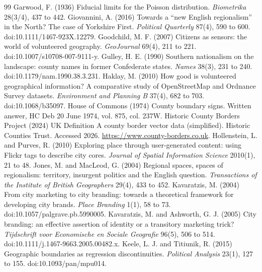 \documentclass[11pt,a4paper]{article}
\begin{document}
\begin{thebibliography}{99}
 Garwood, F. (1936) Fiducial limits for the Poisson distribution. \textit{Biometrika} 28(3/4), 437 to 442.
 Giovannini, A. (2016) Towards a ``new English regionalism'' in the North? The case of Yorkshire First. \textit{Political Quarterly} 87(4), 590 to 600. doi:10.1111/1467-923X.12279.
 Goodchild, M. F. (2007) Citizens as sensors: the world of volunteered geography. \textit{GeoJournal} 69(4), 211 to 221. doi:10.1007/s10708-007-9111-y.
 Gulley, H. E. (1990) Southern nationalism on the landscape: county names in former Confederate states. \textit{Names} 38(3), 231 to 240. doi:10.1179/nam.1990.38.3.231.
 Haklay, M. (2010) How good is volunteered geographical information? A comparative study of OpenStreetMap and Ordnance Survey datasets. \textit{Environment and Planning B} 37(4), 682 to 703. doi:10.1068/b35097.
 House of Commons (1974) County boundary signs. Written answer, HC Deb 20 June 1974, vol. 875, col. 237W.
 Historic County Borders Project (2024) UK Definition A county border vector data (simplified). Historic Counties Trust. Accessed 2026. \url{https://www.county-borders.co.uk}.
 Hollenstein, L. and Purves, R. (2010) Exploring place through user-generated content: using Flickr tags to describe city cores. \textit{Journal of Spatial Information Science} 2010(1), 21 to 48.
 Jones, M. and MacLeod, G. (2004) Regional spaces, spaces of regionalism: territory, insurgent politics and the English question. \textit{Transactions of the Institute of British Geographers} 29(4), 433 to 452.
 Kavaratzis, M. (2004) From city marketing to city branding: towards a theoretical framework for developing city brands. \textit{Place Branding} 1(1), 58 to 73. doi:10.1057/palgrave.pb.5990005.
 Kavaratzis, M. and Ashworth, G. J. (2005) City branding: an effective assertion of identity or a transitory marketing trick? \textit{Tijdschrift voor Economische en Sociale Geografie} 96(5), 506 to 514. doi:10.1111/j.1467-9663.2005.00482.x.
 Keele, L. J. and Titiunik, R. (2015) Geographic boundaries as regression discontinuities. \textit{Political Analysis} 23(1), 127 to 155. doi:10.1093/pan/mpu014.

\end{thebibliography}
\end{document}
